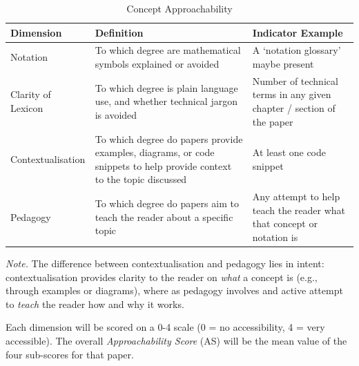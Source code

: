 \begin{table}[h]
    \centering
    \small
    \renewcommand{\arraystretch}{1.75}
    \begin{threeparttable}
        \caption{Concept Approachability}
        \label{tab:conceptual-approachability}
        
        \begin{tabularx}{\textwidth}{@{} l X X @{}}
            \toprule
            \textbf{Dimension} & \textbf{Definition} & \textbf{Indicator Example} \\ \midrule
            Notation & To which degree are mathematical symbols explained or avoided & A `notation glossary' maybe present \\
            Clarity of Lexicon & To which degree is plain language use, and whether technical jargon is avoided & Number of technical terms in any given chapter / section of the paper \\
            Contextualisation & To which degree do papers provide examples, diagrams, or code snippets to help provide context to the topic discussed & At least one code snippet \\
            Pedagogy & To which degree do papers aim to teach the reader about a specific topic & Any attempt to help teach the reader what that concept or notation is \\ \bottomrule
        \end{tabularx}

        \begin{tablenotes}
            \small
            \textit{Note.}
            The difference between contextualisation and pedagogy lies in intent:
            contextualisation provides clarity to the reader on \textit{what} a concept is (e.g., through examples or diagrams), where as
            pedagogy involves and active attempt to \textit{teach} the reader how and why it works.
        \end{tablenotes}
    \end{threeparttable}
\end{table}

Each dimension will be scored on a 0-4 scale (0 = no accessibility, 4 = very accessible). The overall \textit{Approachability Score} (AS) will
be the mean value of the four sub-scores for that paper.

